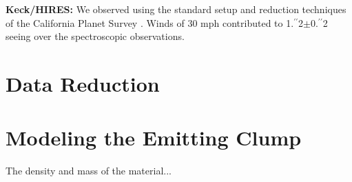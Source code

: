 \documentclass{nature3}
\newcommand{\farcs}{\mbox{\ensuremath{.\!\!^{\prime\prime}}}}%
\begin{document}
\begin{methods}
{\bf Keck/HIRES:}
We observed using the standard setup and reduction techniques of the
California Planet Survey \cite{Howard2010}.
Winds of 30 mph contributed to
1\farcs2$\pm$0\farcs2 seeing over the spectroscopic observations.  


\section{Data Reduction}

\section{Modeling the Emitting Clump}
\label{subsec:model}

The density and mass of the material...





\end{methods}
\end{document}
